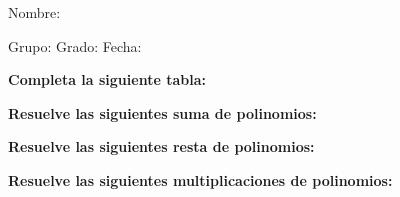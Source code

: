 \documentclass[12pt,addpoints]{exam}
\begin{document}
%

Nombre:\enspace\hrulefill

\vspace{5mm}

Grupo:\enspace\hrulefill
\enspace{}Grado:\enspace\hrulefill
\enspace{}Fecha:\enspace\hrulefill

\begin{questions}

\begin{EnvFullwidth}
  \sffamily\textbf{Completa la siguiente tabla:}
\end{EnvFullwidth}



\begin{EnvFullwidth}
  \sffamily\textbf{Resuelve las siguientes suma de polinomios:}
\end{EnvFullwidth}




\begin{EnvFullwidth}
  \sffamily\textbf{Resuelve las siguientes resta de polinomios:}
\end{EnvFullwidth}





\begin{EnvFullwidth}
  \sffamily\textbf{Resuelve las siguientes multiplicaciones de polinomios:}
\end{EnvFullwidth}





\end{questions}
\end{document}
